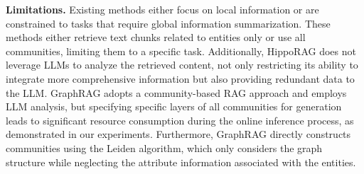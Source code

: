 {\bf Limitations. } Existing methods either focus on local information or are constrained to tasks that require global information summarization.
% 
These methods either retrieve text chunks related to entities only or use all communities, limiting them to a specific task.
% 
Additionally, HippoRAG does not leverage LLMs to analyze the retrieved content, not only restricting its ability to integrate more comprehensive information but also providing redundant data to the LLM.
% 
GraphRAG adopts a community-based RAG approach and employs LLM analysis, but specifying specific layers of all communities for generation leads to significant resource consumption during the online inference process, as demonstrated in our experiments.
% 
Furthermore, GraphRAG directly constructs communities using the Leiden algorithm, which only considers the graph structure while neglecting the attribute information associated with the entities.

